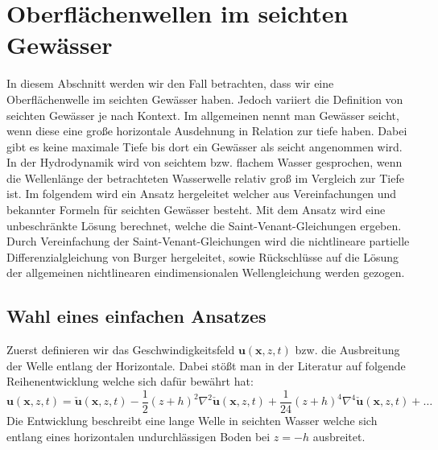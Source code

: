 %
%
%
%
\section{Oberflächenwellen im seichten Gewässer
\label{luke:section:SeichtenGewaesser}}

In diesem Abschnitt werden wir den Fall betrachten, dass wir eine Oberflächenwelle im seichten Gewässer haben. 
Jedoch variiert die Definition von seichten Gewässer je nach Kontext. 
Im allgemeinen nennt man Gewässer seicht, wenn diese eine große horizontale Ausdehnung in Relation zur tiefe haben. 
Dabei gibt es keine maximale Tiefe bis dort ein Gewässer als seicht angenommen wird.
In der Hydrodynamik wird von seichtem bzw. flachem Wasser gesprochen, wenn die Wellenlänge der betrachteten Wasserwelle relativ groß im Vergleich zur Tiefe ist.
Im folgendem wird ein Ansatz hergeleitet welcher aus Vereinfachungen und bekannter Formeln für seichten Gewässer besteht.
Mit dem Ansatz wird eine unbeschränkte Lösung berechnet, welche die Saint-Venant-Gleichungen ergeben.
Durch Vereinfachung der Saint-Venant-Gleichungen wird die nichtlineare partielle Differenzialgleichung von Burger hergeleitet, sowie Rückschlüsse auf die Lösung der allgemeinen nichtlinearen eindimensionalen Wellengleichung werden gezogen. 

\subsection{Wahl eines einfachen Ansatzes}
Zuerst definieren wir das Geschwindigkeitsfeld $\bm{u}(\bm{x},z,t)$ bzw. die Ausbreitung der Welle entlang der Horizontale.
Dabei stößt man in der Literatur auf folgende Reihenentwicklung welche sich dafür bewährt hat:
\[
\bm{u}(\bm{x},z,t) = \check{\bm{u}}(\bm{x},z,t) - \frac{1}{2} (z + h)^2 \nabla^2 \check{\bm{u}}(\bm{x},z,t) + \frac{1}{24} (z + h)^4 \nabla^4 \check{\bm{u}}(\bm{x},z,t) + \ldots
\]
Die Entwicklung beschreibt eine lange Welle in seichten Wasser welche sich entlang eines horizontalen undurchlässigen Boden bei $z = -h$ ausbreitet.


